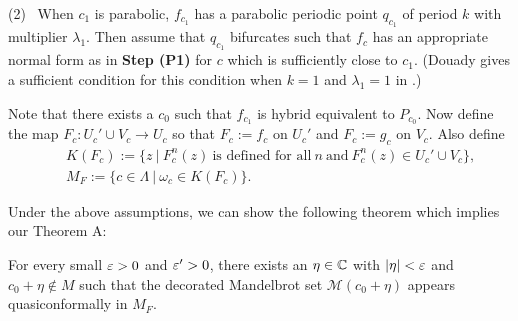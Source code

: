\begin{rem*}
(2) \ When $c_1$ is parabolic, $f_{c_1}$ has a parabolic periodic point 
$q_{c_1}$ of period $k$ with multiplier $\lambda_1$. Then assume that 
$q_{c_1}$ bifurcates such that $f_c$ has an appropriate normal 
form as in {\bf Step (P1)} for $c$ which is sufficiently close to $c_1$. 
(Douady gives a sufficient condition for this condition when $k=1$ and 
$\lambda_1 = 1$ in \cite[p.23]{Douady 2000}.)

\medskip


\noin
Note that there exists a $c_0$ such that $f_{c_1}$ is hybrid equivalent to
$P_{c_0}$. Now define the map $F_c : U_c' \cup V_c \to U_c$ so that
$F_c := f_c$ on $U_c'$ and $F_c := g_c$ on $V_c$. Also define
\begin{eqnarray*}
& & K(F_c) := \{ z \ | \ F_c^n(z) \ \text{is defined for all} \ n \ 
              \text{and} \ F_c^n(z) \in U_c' \cup V_c \}, \\
& & M_F := \{ c \in \Lambda \ | \ \omega_c \in K(F_c) \}.
\end{eqnarray*}

\noin
Under the above assumptions, we can show the following theorem which
implies our Theorem A:

\begin{thmA'*}
For every small $\varepsilon > 0$ and $\varepsilon' > 0$, there exists an 
$\eta \in \mathbb C$ with $|\eta| < \varepsilon$ and
$c_0+\eta \notin M$ such that the
decorated Mandelbrot set ${\mathcal M}(c_0+\eta)$ appears quasiconformally
in $M_F$. 
\end{thmA'*}

\end{rem*}






